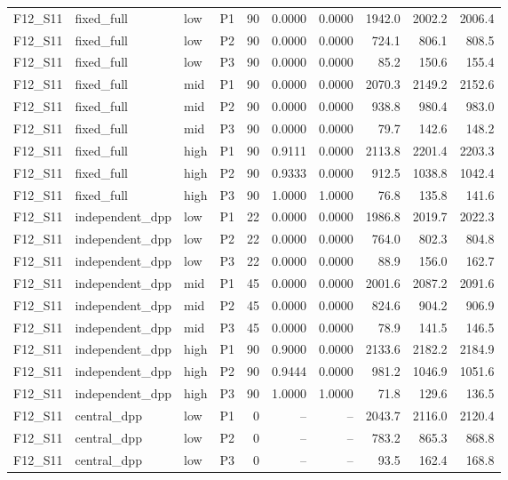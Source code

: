 \begin{longtable}{llllrrrrrr}
F12\_S11 & fixed\_full & low & P1 & 90 & 0.0000 & 0.0000 & 1942.0 & 2002.2 & 2006.4 \\
F12\_S11 & fixed\_full & low & P2 & 90 & 0.0000 & 0.0000 & 724.1 & 806.1 & 808.5 \\
F12\_S11 & fixed\_full & low & P3 & 90 & 0.0000 & 0.0000 & 85.2 & 150.6 & 155.4 \\
F12\_S11 & fixed\_full & mid & P1 & 90 & 0.0000 & 0.0000 & 2070.3 & 2149.2 & 2152.6 \\
F12\_S11 & fixed\_full & mid & P2 & 90 & 0.0000 & 0.0000 & 938.8 & 980.4 & 983.0 \\
F12\_S11 & fixed\_full & mid & P3 & 90 & 0.0000 & 0.0000 & 79.7 & 142.6 & 148.2 \\
F12\_S11 & fixed\_full & high & P1 & 90 & 0.9111 & 0.0000 & 2113.8 & 2201.4 & 2203.3 \\
F12\_S11 & fixed\_full & high & P2 & 90 & 0.9333 & 0.0000 & 912.5 & 1038.8 & 1042.4 \\
F12\_S11 & fixed\_full & high & P3 & 90 & 1.0000 & 1.0000 & 76.8 & 135.8 & 141.6 \\
F12\_S11 & independent\_dpp & low & P1 & 22 & 0.0000 & 0.0000 & 1986.8 & 2019.7 & 2022.3 \\
F12\_S11 & independent\_dpp & low & P2 & 22 & 0.0000 & 0.0000 & 764.0 & 802.3 & 804.8 \\
F12\_S11 & independent\_dpp & low & P3 & 22 & 0.0000 & 0.0000 & 88.9 & 156.0 & 162.7 \\
F12\_S11 & independent\_dpp & mid & P1 & 45 & 0.0000 & 0.0000 & 2001.6 & 2087.2 & 2091.6 \\
F12\_S11 & independent\_dpp & mid & P2 & 45 & 0.0000 & 0.0000 & 824.6 & 904.2 & 906.9 \\
F12\_S11 & independent\_dpp & mid & P3 & 45 & 0.0000 & 0.0000 & 78.9 & 141.5 & 146.5 \\
F12\_S11 & independent\_dpp & high & P1 & 90 & 0.9000 & 0.0000 & 2133.6 & 2182.2 & 2184.9 \\
F12\_S11 & independent\_dpp & high & P2 & 90 & 0.9444 & 0.0000 & 981.2 & 1046.9 & 1051.6 \\
F12\_S11 & independent\_dpp & high & P3 & 90 & 1.0000 & 1.0000 & 71.8 & 129.6 & 136.5 \\
F12\_S11 & central\_dpp & low & P1 & 0 & -- & -- & 2043.7 & 2116.0 & 2120.4 \\
F12\_S11 & central\_dpp & low & P2 & 0 & -- & -- & 783.2 & 865.3 & 868.8 \\
F12\_S11 & central\_dpp & low & P3 & 0 & -- & -- & 93.5 & 162.4 & 168.8 \\

\end{longtable}
